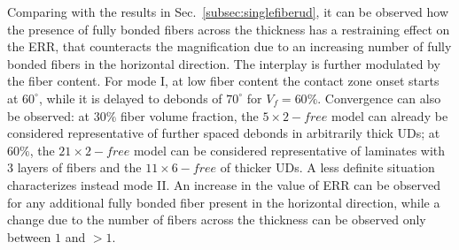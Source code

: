 \documentclass[review]{elsarticle}
\begin{document}
Comparing with the results in Sec.~\ref{subsec:singlefiberud}, it can be observed how the presence of fully bonded fibers across the thickness has a restraining effect on the ERR, that counteracts the magnification due to an increasing number of fully bonded fibers in the horizontal direction. The interplay is further modulated by the fiber content. For mode I, at low fiber content the contact zone onset starts at $60^{\circ}$, while it is delayed to debonds of $70^{\circ}$ for $V_{f}=60\%$. Convergence can also be observed: at $30\%$ fiber volume fraction, the $5\times 2-free$ model can already be considered representative of further spaced debonds in arbitrarily thick UDs; at $60\%$, the $21\times 2-free$ model can be considered representative of laminates with 3 layers of fibers and the $11\times 6-free$ of thicker UDs. A less definite situation characterizes instead mode II. An increase in the value of ERR can be observed for any additional fully bonded fiber present in the horizontal direction, while a change due to the number of fibers across the thickness can be observed only between $1$ and $>1$.
\end{document}
